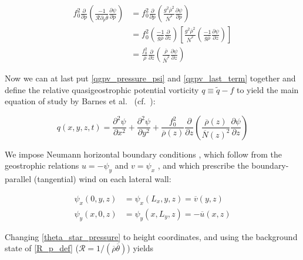 \documentclass{article}
\begin{document}
\begin{equation}\label{qgpv_last_term}
\begin{aligned}
     f_0^2 \frac{\partial}{\partial p} \left( \frac{-1}{\mathcal{R} \partial_p \overline\theta} \frac{\partial \psi}{\partial p}\right) &= f_0^2 \frac{\partial}{\partial p} \left( \frac{g^2 \overline\rho^2 }{\overline{N}^2} \frac{\partial \psi}{\partial p}\right) \\
     &= f_0^2 \left(\frac{- 1}{g \overline\rho} \frac{\partial }{\partial z}\right) \left [ \frac{g^2 \overline\rho^2 }{\overline{N}^2} \left(\frac{- 1}{g \overline\rho} \frac{\partial \psi}{\partial z}\right)\right] \\
     &= \frac{f_0^2}{\overline{\rho}} \frac{\partial}{\partial z} \left( \frac{\overline{\rho}}{\overline{N}^2}  \frac{\partial \psi}{\partial z} \right)
\end{aligned}
\end{equation}

Now we can at last put \cref{qgpv_pressure_psi} and \cref{qgpv_last_term} together and define the relative quasigeostrophic potential vorticity $q \equiv \tilde q - f$ \cite{sprenger2007userguide} to yield the main equation of study by Barnes et al.\ \cite{Barnes2022main} (cf.\ \cite{Vallis2017}):

\begin{equation}\label{qgpv}
    \boxed{ q(x,y,z,t) = \frac{\partial^2 \psi}{\partial x^2} + \frac{\partial^2 \psi}{\partial y^2} + \frac{f_0^2}{\overline{\rho}(z)} \frac{\partial}{\partial z} \left( \frac{\overline{\rho}(z)}{\overline{N}(z)^2}  \frac{\partial \psi}{\partial z} \right) } 
\end{equation}

We impose Neumann horizontal boundary conditions \cite{Barnes2022main,sprenger2007userguide}, which follow from the geostrophic relations $u = -\psi_y$ and $v = \psi_x$ \cite{Barnes2022main}, and which prescribe the boundary-parallel (tangential) wind on each lateral wall:

\begin{equation}\label{qgpv_bcs_hor}
\boxed{
\begin{aligned}
    \psi_x(0,y, z) &= \psi_x(L_x,y, z) = \overline v(y,z) \\
    \psi_y(x,0, z) &= \psi_y(x,L_y, z) =- \overline u(x,z)
\end{aligned}
}
\end{equation}

Changing \cref{theta_star_pressure} to height coordinates, and using the background state of \cref{R_p_def} ($\mathcal{R} = 1/\left(\overline{\rho} \overline\theta\right)$) yields
\end{document}
